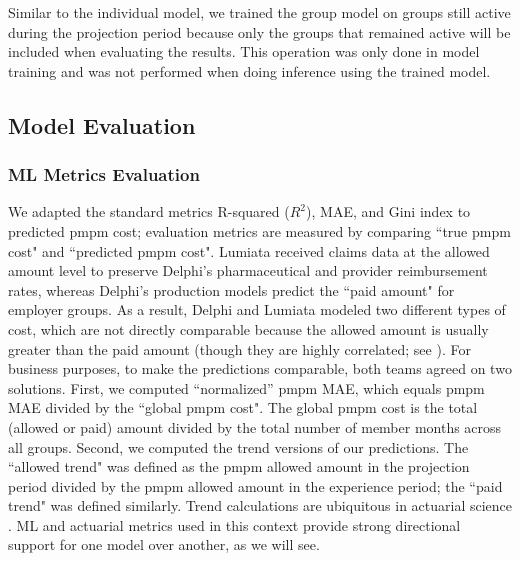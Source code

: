 \documentclass[letterpaper]{article}
\begin{document}
Similar to the individual model, we trained the group model on groups still active during the projection period because only the groups that remained active will be included when evaluating the results. This operation was only done in model training and was not performed when doing inference using the trained model.




\subsection{Model Evaluation}


\subsubsection{ML Metrics Evaluation}
We adapted the standard metrics R-squared ($R^{2}$), MAE, and Gini index \cite{gini} to predicted pmpm cost; evaluation metrics are measured by comparing ``true pmpm cost" and ``predicted pmpm cost". Lumiata received claims data at the allowed amount level to preserve Delphi's pharmaceutical and provider reimbursement rates, whereas Delphi's production models predict the ``paid amount" for employer groups. As a result, Delphi and Lumiata modeled two different types of cost, which are not directly comparable because the allowed amount is usually greater than the paid amount (though they are highly correlated; see \citeauthor{AccRisk} \citeyear{AccRisk}). For business purposes, to make the predictions comparable, both teams agreed on two solutions. First, we computed ``normalized'' pmpm MAE, which equals pmpm MAE divided by the ``global pmpm cost". The global pmpm cost is the total (allowed or paid) amount divided by the total number of member months across all groups.  Second, we computed the trend versions of our predictions. The ``allowed trend" was defined as the pmpm allowed amount in the projection period divided by the pmpm allowed amount in the experience period; the ``paid trend" was defined similarly.  Trend calculations are ubiquitous in actuarial science \cite{SOATrend}.  ML and actuarial metrics used in this context provide strong directional support for one model over another, as we will see.
\end{document}
